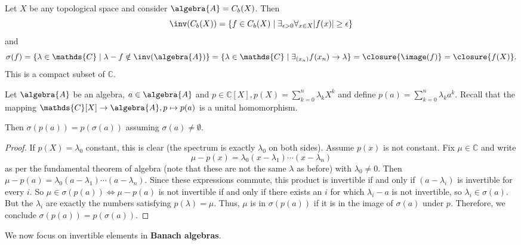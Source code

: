\documentclass[a4paper]{article}
\begin{document}
\begin{example}
	Let $X$ be any topological space and consider $\algebra{A} = C_b(X)$. Then
	\begin{equation*}
		\inv(C_b(X)) = \{f \in C_b(X) \mid \exists_{\epsilon > 0} \forall_{x \in X} |f(x)| \geq \epsilon \}
	\end{equation*}
	and
	\begin{equation*}
		\sigma(f) = \{\lambda \in \mathds{C} \mid \lambda - f \notin \inv(\algebra{A}) \} = \{\lambda \in \mathds{C} \mid \exists_{(x_n)} f(x_n) \to \lambda\} = \closure{\image(f)} = \closure{f(X)} \text{.}
	\end{equation*}
	This is a compact subset of $\mathds{C}$.
\end{example}

\begin{theorem}
	Let $\algebra{A}$ be an algebra, $a \in \algebra{A}$ and $p \in \mathds{C}[X], p(X) = \sum_{k = 0}^{n} \lambda_k X^k$ and define $p(a) = \sum_{k = 0}^{n} \lambda_k a^k$. Recall that the mapping $\mathds{C}[X] \to \algebra{A}, p \mapsto p(a)$ is a unital homomorphism.

	Then $\sigma(p(a)) = p(\sigma(a))$ assuming $\sigma(a) \neq \emptyset$.
\end{theorem}

\begin{proof}
	If $p(X) = \lambda_0$ constant, this is clear (the spectrum is exactly $\lambda_0$ on both sides). Assume $p(x)$ is not constant. Fix $\mu \in \mathds{C}$ and write
	\begin{equation*}
		\mu - p(x) = \lambda_0 (x - \lambda_1) \cdots (x - \lambda_n)
	\end{equation*}
	as per the fundamental theorem of algebra (note that these are not the same $\lambda$ as before) with $\lambda_0 \neq 0$.  Then $\mu - p(a) = \lambda_0 (a - \lambda_1)\cdots(a - \lambda_n)$. Since these expressions commute, this product is invertible if and only if $(a - \lambda_i)$ is invertible for every $i$. So $\mu \in \sigma(p(a)) \iff \mu - p(a)$ is not invertible if and only if there exists an $i$ for which $\lambda_i - a$ is not invertible, so $\lambda_i \in \sigma(a)$. But the $\lambda_i$ are exactly the numbers satisfying $p(\lambda) = \mu$. Thus, $\mu$ is in $\sigma(p(a))$ if it is in the image of $\sigma(a)$ under $p$. Therefore, we conclude $\sigma(p(a)) = p(\sigma(a))$.
\end{proof}

We now focus on invertible elements in \textbf{Banach algebras}.
\end{document}
